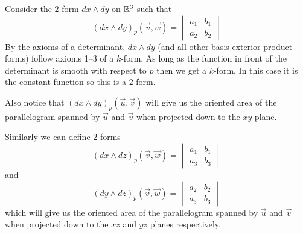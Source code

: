 \documentclass[notes]{subfiles}
\begin{document}
\begin{example}
    Consider the $2$-form $dx \wedge dy$ on $\mathbb{R}^3$ such that
    \[
        (dx \wedge dy)_p(\vec{v}, \vec{w}) =
        \begin{vmatrix}
            a_1 & b_1 \\
            a_2 & b_2
        \end{vmatrix}
    \]
    By the axioms of a determinant, $dx \wedge dy$ (and all other basis exterior product forms) follow axioms 1--3 of a $k$-form. As long as the function in front of the determinant is smooth with respect to $p$ then we get a $k$-form. In this case it is the constant function so this is a $2$-form.

    Also notice that $(dx \wedge dy)_p(\vec{u}, \vec{v})$ will give us the oriented area of the parallelogram spanned by $\vec{u}$ and $\vec{v}$ when projected down to the $xy$ plane.

    Similarly we can define $2$-forms
    \[
        (dx \wedge dz)_p(\vec{v}, \vec{w}) =
        \begin{vmatrix}
            a_1 & b_1 \\
            a_3 & b_3
        \end{vmatrix}
    \]
    and
    \[
        (dy \wedge dz)_p(\vec{v}, \vec{w}) =
        \begin{vmatrix}
            a_2 & b_2 \\
            a_3 & b_3
        \end{vmatrix}
    \]
    which will give us the oriented area of the parallelogram spanned by $\vec{u}$ and $\vec{v}$ when projected down to the $xz$ and $yz$ planes respectively.
\end{example}
\end{document}
